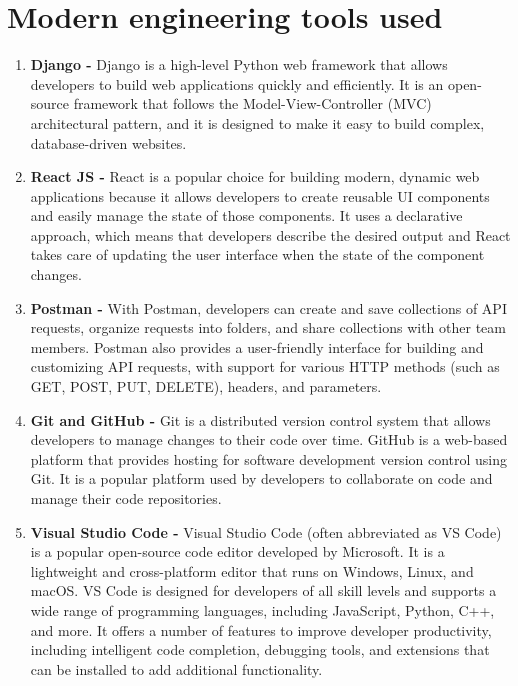 \documentclass[a4paper, 12pt]{article}
\begin{document}
\newpage

\section{Modern engineering tools used }
\begin{enumerate}
    \item \textbf{Django -} Django is a high-level Python web framework that allows developers to build web applications quickly and efficiently. It is an open-source framework that follows the Model-View-Controller (MVC) architectural pattern, and it is designed to make it easy to build complex, database-driven websites.
    \item \textbf{React JS -} React is a popular choice for building modern, dynamic web applications because it allows developers to create reusable UI components and easily manage the state of those components. It uses a declarative approach, which means that developers describe the desired output and React takes care of updating the user interface when the state of the component changes.
    \item \textbf{Postman -} With Postman, developers can create and save collections of API requests, organize requests into folders, and share collections with other team members. Postman also provides a user-friendly interface for building and customizing API requests, with support for various HTTP methods (such as GET, POST, PUT, DELETE), headers, and parameters.
    \item\textbf{Git and GitHub -} Git is a distributed version control system that allows developers to manage changes to their code over time. GitHub is a web-based platform that provides hosting for software development version control using Git. It is a popular platform used by developers to collaborate on code and manage their code repositories.
    \item\textbf{Visual Studio Code -} Visual Studio Code (often abbreviated as VS Code) is a popular open-source code editor developed by Microsoft. It is a lightweight and cross-platform editor that runs on Windows, Linux, and macOS. VS Code is designed for developers of all skill levels and supports a wide range of programming languages, including JavaScript, Python, C++, and more. It offers a number of features to improve developer productivity, including intelligent code completion, debugging tools, and extensions that can be installed to add additional functionality.
\end{enumerate}
\end{document}
